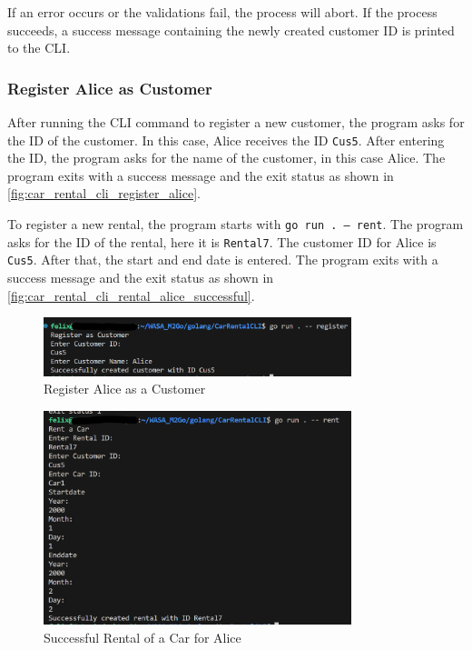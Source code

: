 If an error occurs or the validations fail, the process will abort.
If the process succeeds, a success message containing the newly created customer ID is printed to the CLI.

\subsubsection*{Register Alice as Customer}
After running the CLI command to register a new customer, the program asks for the ID of the customer.
In this case, Alice receives the ID \texttt{Cus5}.
After entering the ID, the program asks for the name of the customer, in this case Alice.
The program exits with a success message and the exit status as shown in \autoref{fig:car_rental_cli_register_alice}.

To register a new rental, the program starts with \texttt{go run . --- rent}.
The program asks for the ID of the rental, here it is \texttt{Rental7}.
The customer ID for Alice is \texttt{Cus5}.
After that, the start and end date is entered.
The program exits with a success message and the exit status as shown in \autoref{fig:car_rental_cli_rental_alice_successful}.

\begin{figure}
      \centering
      \includegraphics[width=0.8\textwidth]{figures/goLang/carRental/carRentalCLI/carRentalCLI_RegisterAlice.png}
      \caption{Register Alice as a Customer}
      \label{fig:car_rental_cli_register_alice}
\end{figure}
\begin{figure}
      \centering
      \includegraphics[width=0.8\textwidth]{figures/goLang/carRental/carRentalCLI/carRentalCLI_SuccessfulRentalAlice.png}
      \caption{Successful Rental of a Car for Alice}
      \label{fig:car_rental_cli_rental_alice_successful}
\end{figure}
